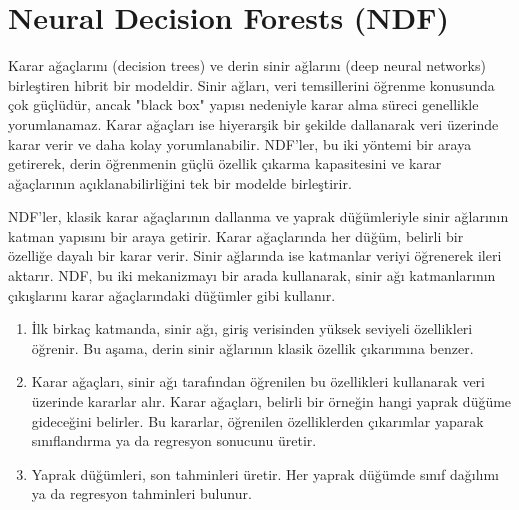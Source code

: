 \section{Neural Decision Forests (NDF)}

Karar ağaçlarını (decision trees) ve derin sinir ağlarını (deep neural networks) birleştiren hibrit bir modeldir. Sinir ağları, veri temsillerini öğrenme konusunda çok güçlüdür, ancak "black box" yapısı nedeniyle karar alma süreci genellikle yorumlanamaz. Karar ağaçları ise hiyerarşik bir şekilde dallanarak veri üzerinde karar verir ve daha kolay yorumlanabilir. NDF’ler, bu iki yöntemi bir araya getirerek, derin öğrenmenin güçlü özellik çıkarma kapasitesini ve karar ağaçlarının açıklanabilirliğini tek bir modelde birleştirir.

NDF’ler, klasik karar ağaçlarının dallanma ve yaprak düğümleriyle sinir ağlarının katman yapısını bir araya getirir. Karar ağaçlarında her düğüm, belirli bir özelliğe dayalı bir karar verir. Sinir ağlarında ise katmanlar veriyi öğrenerek ileri aktarır. NDF, bu iki mekanizmayı bir arada kullanarak, sinir ağı katmanlarının çıkışlarını karar ağaçlarındaki düğümler gibi kullanır.

\begin{enumerate}
    \item İlk birkaç katmanda, sinir ağı, giriş verisinden yüksek seviyeli özellikleri öğrenir. Bu aşama, derin sinir ağlarının klasik özellik çıkarımına benzer.
    \item Karar ağaçları, sinir ağı tarafından öğrenilen bu özellikleri kullanarak veri üzerinde kararlar alır. Karar ağaçları, belirli bir örneğin hangi yaprak düğüme gideceğini belirler. Bu kararlar, öğrenilen özelliklerden çıkarımlar yaparak sınıflandırma ya da regresyon sonucunu üretir.
    \item Yaprak düğümleri, son tahminleri üretir. Her yaprak düğümde sınıf dağılımı ya da regresyon tahminleri bulunur.
\end{enumerate}

\newpage
